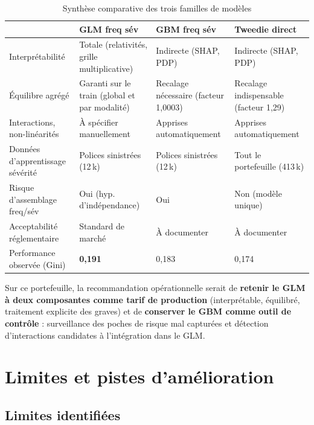 \documentclass[11pt,a4paper]{article}
\begin{document}
\begin{table}[H]
\centering
\caption{Synthèse comparative des trois familles de modèles}
\small
\begin{tabular}{p{3.2cm}p{3.6cm}p{3.6cm}p{3.6cm}}
\toprule
 & GLM freq \texttimes{} sév & GBM freq \texttimes{} sév & Tweedie direct \\
\midrule
Interprétabilité & Totale (relativités, grille multiplicative) & Indirecte (SHAP, PDP) & Indirecte (SHAP, PDP) \\
\addlinespace
Équilibre agrégé & Garanti sur le train (global et par modalité) & Recalage nécessaire (facteur 1{,}0003) & Recalage indispensable (facteur 1{,}29) \\
\addlinespace
Interactions, non-linéarités & À spécifier manuellement & Apprises automatiquement & Apprises automatiquement \\
\addlinespace
Données d'apprentissage sévérité & Polices sinistrées (12\,k) & Polices sinistrées (12\,k) & Tout le portefeuille (413\,k) \\
\addlinespace
Risque d'assemblage freq/sév & Oui (hyp. d'indépendance) & Oui & Non (modèle unique) \\
\addlinespace
Acceptabilité réglementaire & Standard de marché & À documenter & À documenter \\
\addlinespace
Performance observée (Gini) & \textbf{0{,}191} & 0{,}183 & 0{,}174 \\
\bottomrule
\end{tabular}
\end{table}

Sur ce portefeuille, la recommandation opérationnelle serait de \textbf{retenir le GLM à deux composantes comme tarif de production} (interprétable, équilibré, traitement explicite des graves) et de \textbf{conserver le GBM comme outil de contrôle} : surveillance des poches de risque mal capturées et détection d'interactions candidates à l'intégration dans le GLM.

\section{Limites et pistes d'amélioration}

\subsection{Limites identifiées}
\end{document}
